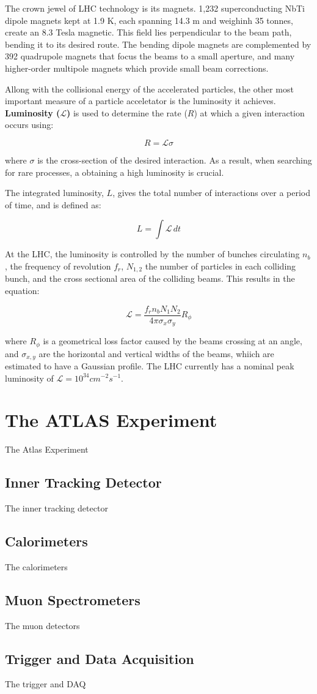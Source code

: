 The crown jewel of LHC technology is its magnets. 1,232 superconducting NbTi dipole magnets kept at 1.9 K, each spanning 14.3 m and weighinh 35 tonnes, create an 8.3 Tesla magnetic. This field lies perpendicular to the beam path, bending it to its desired route. The bending dipole magnets are complemented by 392 quadrupole magnets that focus the beams to a small aperture, and many higher-order multipole magnets which provide small beam corrections.

Allong with the collisional energy of the accelerated particles, the other most important measure of a particle acceletator is the luminosity it achieves. \textbf{Luminosity ($\mathcal{L}$)} is used to determine the rate ($R$) at which a given interaction occurs using:

$$R = \mathcal{L}\sigma$$

where $\sigma$ is the cross-section of the desired interaction. As a result, when searching for rare processes, a obtaining a high luminosity is crucial.

The integrated luminosity, $L$, gives the total number of interactions over a period of time, and is defined as:

$$ L = \int \mathcal{L}\, dt$$

At the LHC, the luminosity is controlled by the number of bunches circulating $n_b$, the frequency of revolution $f_r$, $N_{1,2}$ the number of particles in each colliding bunch, and the cross sectional area of the colliding beams. This results in the equation:

$$\mathcal{L}  = \frac{ f_rn_bN_1N_2 }{4\pi\sigma_x\sigma_y}R_{\phi} $$

where $R_{\phi}$ is a geometrical loss factor caused by the beams crossing at an angle, and $\sigma_{x,y}$ are the horizontal and vertical widths of the beams, whiich are estimated to have a Gaussian profile. The LHC currently has a nominal peak luminosity of $\mathcal{L} = 10^{34} cm^{-2}s^{-1}$.

\section{The ATLAS Experiment}
\label{section:atlas}
The Atlas Experiment
\subsection{Inner Tracking Detector}
The inner tracking detector
\subsection{Calorimeters}
The calorimeters
\subsection{Muon Spectrometers}
The muon detectors
\subsection{Trigger and Data Acquisition}
The trigger and DAQ

% 
